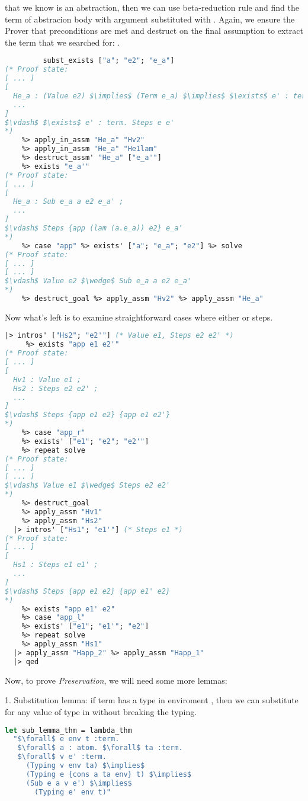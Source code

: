 \documentclass[english, mgr]{iithesis}
\newcommand{\lstt}[1]{{\text{\lstinline[columns=fixed,mathescape]{#1}}}}
\renewcommand{\it}[1]{\textit{#1}}
\begin{document}
that we know \lstt{e1} is an abstraction, then we can use beta-reduction rule
and find the term of abstracion body \lstt{e\_a} with argument \lstt{a}
substituted with \lstt{e2}. Again, we ensure the Prover that preconditions are met
and destruct on the final assumption to extract the term that we searched for: \lstt{e\_a'}.
\begin{lstlisting}[mathescape,language=OCaml,escapebegin=\color{codegreen}]
    %> add_assumption_thm_spec "He_a"
         subst_exists ["a"; "e2"; "e_a"]
(* Proof state:
[ ... ]
[
  He_a : (Value e2) $\implies$ (Term e_a) $\implies$ $\exists$ e' : term. Sub e_a a e2 e' ;
  ...
]
$\vdash$ $\exists$ e' : term. Steps e e'
*)
    %> apply_in_assm "He_a" "Hv2"
    %> apply_in_assm "He_a" "He1lam"
    %> destruct_assm' "He_a" ["e_a'"]
    %> exists "e_a'"
(* Proof state:
[ ... ]
[
  He_a : Sub e_a a e2 e_a' ;
  ...
]
$\vdash$ Steps {app (lam (a.e_a)) e2} e_a'
*)
    %> case "app" %> exists' ["a"; "e_a"; "e2"] %> solve
(* Proof state:
[ ... ]
[ ... ]
$\vdash$ Value e2 $\wedge$ Sub e_a a e2 e_a'
*)
    %> destruct_goal %> apply_assm "Hv2" %> apply_assm "He_a"
\end{lstlisting}
Now what's left is to examine straightforward cases where either \lstt{e1} or \lstt{e2} steps.
\begin{lstlisting}[mathescape,language=OCaml,escapebegin=\color{codegreen}]
  |> intros' ["Hs2"; "e2'"] (* Value e1, Steps e2 e2' *)
     %> exists "app e1 e2'"
(* Proof state:
[ ... ]
[
  Hv1 : Value e1 ;
  Hs2 : Steps e2 e2' ;
  ...
]
$\vdash$ Steps {app e1 e2} {app e1 e2'}
*)
    %> case "app_r"
    %> exists' ["e1"; "e2"; "e2'"]
    %> repeat solve
(* Proof state:
[ ... ]
[ ... ]
$\vdash$ Value e1 $\wedge$ Steps e2 e2'
*)
    %> destruct_goal
    %> apply_assm "Hv1"
    %> apply_assm "Hs2"
  |> intros' ["Hs1"; "e1'"] (* Steps e1 *)
(* Proof state:
[ ... ]
[
  Hs1 : Steps e1 e1' ;
  ...
]
$\vdash$ Steps {app e1 e2} {app e1' e2}
*)
    %> exists "app e1' e2"
    %> case "app_l"
    %> exists' ["e1"; "e1'"; "e2"]
    %> repeat solve
    %> apply_assm "Hs1"
  |> apply_assm "Happ_2" %> apply_assm "Happ_1"
  |> qed
\end{lstlisting}
Now, to prove \it{Preservation}, we will need some more lemmas:

1. Substitution lemma:
if term \lstt{e} has a type \lstt{t} in enviroment \lstt{\{cons a ta env\}},
then we can substitute \lstt{a} for any value \lstt{v} of type \lstt{ta} in \lstt{e} without breaking the typing.
\begin{lstlisting}[mathescape,language=OCaml,escapebegin=\color{codepurple}]
let sub_lemma_thm = lambda_thm
  "$\forall$ e env t :term.
   $\forall$ a : atom. $\forall$ ta :term.
   $\forall$ v e' :term.
     (Typing v env ta) $\implies$
     (Typing e {cons a ta env} t) $\implies$
     (Sub e a v e') $\implies$
       (Typing e' env t)"
\end{lstlisting}
\end{document}
